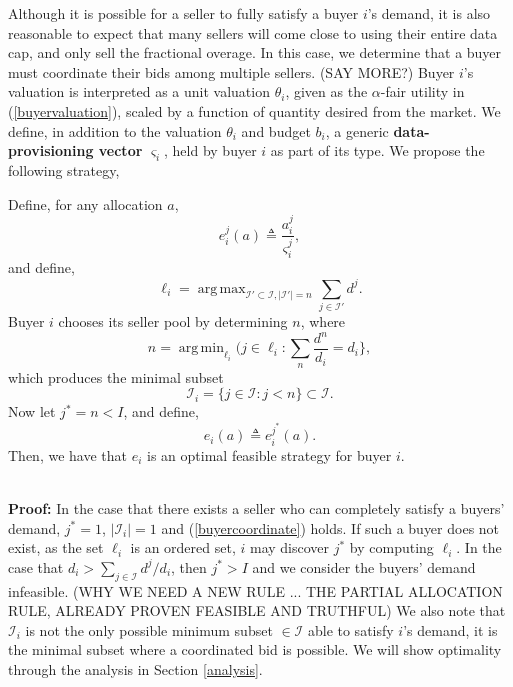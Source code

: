 \documentclass[12pt]{article}
\theoremstyle{definition}
\newcommand{\vs}{\varsigma}
\newcommand{\mcI}{\mathcal{I}}
\DeclareMathOperator*{\argmax}{arg\,max}
\DeclareMathOperator*{\argmin}{arg\,min}
\begin{document}
\begin{multicols}{2}
Although it is possible for a seller to fully satisfy a buyer $i$'s demand, it
is also reasonable to expect that many sellers will come close to using their
entire data cap, and only sell the fractional overage. In this case, we
determine that a buyer must coordinate their bids among multiple sellers. (SAY
MORE?) Buyer $i$'s valuation is interpreted as a unit valuation $\theta_i$, given as
the $\alpha$-fair utility in (\ref{buyervaluation}), scaled
by a function of quantity desired from the market. 
We define, in addition to the valuation $\theta_i$ and budget $b_i$, a generic
\textbf{data-provisioning vector} $\vs_i$, held by buyer $i$ as part of its type. We propose the
following strategy,
{
\label{buyerstrategy}
Define, for any allocation $a$,
\begin{equation}\label{opt-out}
    e_i^j(a) \triangleq \frac{a_i^j}{\vs_i^j},
\end{equation}
and define,
$$
    \ell_i =\argmax_{\mcI' \subset \mcI, \vert\mcI'\vert =
n}\sum_{j\in\mcI'} d^j.
$$
Buyer $i$ chooses its seller pool by determining $n$, where
\begin{equation}\label{buyercoordinate}
    n = \argmin_{\ell_i}(j \in \ell_i : \displaystyle\sum_{n} \frac{d^n}{d_i} = d_i\rbrace,
\end{equation} 
which produces the minimal subset 
\begin{equation}\label{buyers}
    \mcI_i = \lbrace j \in \mcI : j < n\rbrace \subset \mcI.
\end{equation} 
Now let $j^* = n < I$, and define, 
\begin{equation}\label{opt-quantity}
    e_i(a) \triangleq e_i^{j^*}(a).
\end{equation}
Then, we have that $e_i$
is an optimal feasible strategy for buyer $i$.
\iffalse
where $n\in\mcI$ is chosen so that
\begin{equation}\label{minset}
    \mcI_i = \bigg\lbrace j \in  \ell_i:
\displaystyle\sum_{j\in \ell_i} d^j = d_i \bigg\rbrace.
\end{equation} 
so $\mcI_i \subset \mcI$ is the
minimal subset of sellers (which may be empty or unary) whose data is
sufficient to sum to \emph{exactly}
(DO I WANT EXACTLY? ... YES) the demand $d_i$.
\fi
}\\
\textbf{Proof:}
In the case that there exists a seller who can completely satisfy a buyers'
demand, $j^*=1$, $\vert \mcI_i\vert =1$ and (\ref{buyercoordinate}) holds. If such a buyer does not exist,
as the set $\ell_i$ is an ordered set, $i$ may discover 
$j^*$ by computing $\ell_i$. In the case that $d_i >
\sum_{j\in\mcI}d^j/d_i$, then $j^* > I$ and we consider the buyers' demand
infeasible. (WHY WE NEED A NEW RULE ... THE PARTIAL ALLOCATION RULE, ALREADY PROVEN FEASIBLE
AND TRUTHFUL)
We also note that $\mcI_i$ is not the only
possible minimum subset $\in\mcI$ able to satisfy $i$'s demand, it is the minimal subset where a
coordinated bid is possible. We will show optimality through the
analysis in Section \ref{analysis}.


\end{multicols}
\end{document}
